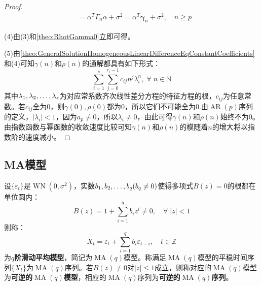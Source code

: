 \begin{proof}
\begin{align*}
		&=\alpha^T\Gamma_n\alpha+\sigma^2=\alpha^T\boldsymbol{\gamma}_n+\sigma^2,\quad n\geqslant p
	\end{align*}\par
	(4)由(3)和\cref{theo:RhotGamma0}立即可得。\par
	(5)由\cref{theo:GeneralSolutionHomogeneousLinearDifferenceEqConstantCoefficients}和(4)可知$\gamma(n)$和$\rho(n)$的通解都具有如下形式：
	\begin{equation*}
		\sum_{i=1}^{s}\sum_{j=0}^{r_i-1}c_{ij}n^{j}\lambda_i^n,\;\forall\;n\in\mathbb{N}
	\end{equation*}
	其中$\lambda_1, \lambda_2, \dots, \lambda_{s}$为对应常系数齐次线性差分方程的特征方程的根，$c_{ij}$为任意常数。若$c_{ij}$全为$0$，则$\gamma(0),\rho(0)$都为$0$，所以它们不可能全为$0$.由$\operatorname{AR}(p)$序列的定义，$|\lambda_i|<1$，因为$a_p\ne0$，所以$\lambda_i\ne0$，由此可得$\gamma(n)$和$\rho(n)$始终不为$0$。由指数函数与幂函数的收敛速度比较可知$\gamma(n)$和$\rho(n)$的模随着$n$的增大将以指数阶的速度减小。
\end{proof}

\subsection{MA模型}
\begin{definition}
	设$\{\varepsilon_t\}$是$\operatorname{WN}(0,\sigma^2)$，实数$b_1, b_2, \dots, b_{q}(b_q\ne0)$使得多项式$B(z)=0$的根都在单位圆内：
	\begin{equation*}
		B(z)=1+\sum_{i=1}^{q}b_iz^i\ne0,\quad\forall\;|z|<1
	\end{equation*}
	则称：
	\begin{equation*}
		X_t=\varepsilon_t+\sum_{i=1}^{q}b_i\varepsilon_{t-i},\quad t\in\mathbb{Z}
	\end{equation*}
	为\textbf{$q$阶滑动平均模型}，简记为$\operatorname{MA}(q)$模型。称满足$\operatorname{MA}(q)$模型的平稳时间序列$\{X_t\}$为$\operatorname{MA}(q)$序列。若$B(z)\ne0$对$|z|\leqslant1$成立，则称对应的$\operatorname{MA}(q)$模型为\textbf{可逆的$\operatorname{MA}(q)$模型}，相应的$\operatorname{MA}(q)$序列为\textbf{可逆的$\operatorname{MA}(q)$序列}。
\end{definition}
